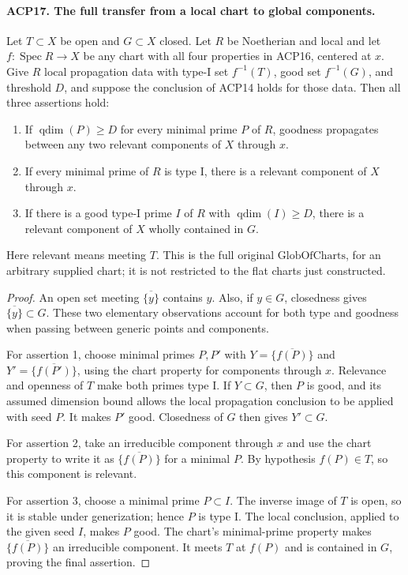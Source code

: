 \documentclass[11pt,a4paper]{article}
\numberwithin{equation}{section}
\theoremstyle{remark}\newtheorem{remark}[theorem]{Remark}
\begin{document}
\paragraph{ACP17. The full transfer from a local chart to global components.}
\label{claim:ACP17}
Let \(T\subset X\) be open and \(G\subset X\) closed.
Let \(R\) be Noetherian and local and let
\(f:\operatorname{Spec}R\to X\) be any chart with all four
properties in ACP16, centered at \(x\).  Give \(R\) local
propagation data with type-I set \(f^{-1}(T)\), good set
\(f^{-1}(G)\), and threshold \(D\), and suppose the conclusion
of ACP14 holds for those data.  Then all three assertions hold:
\begin{enumerate}
\item If \(\operatorname{qdim}(P)\ge D\) for every minimal
      prime \(P\) of \(R\), goodness propagates between any
      two relevant components of \(X\) through \(x\).
\item If every minimal prime of \(R\) is type I, there is
      a relevant component of \(X\) through \(x\).
\item If there is a good type-I prime \(I\) of \(R\) with
      \(\operatorname{qdim}(I)\ge D\), there is a relevant
      component of \(X\) wholly contained in \(G\).
\end{enumerate}
Here relevant means meeting \(T\).  This is the full original
\(\mathrm{GlobOfCharts}\), for an arbitrary supplied chart;
it is not restricted to the flat charts just constructed.

\begin{proof}
An open set meeting \(\overline{\{y\}}\) contains \(y\).
Also, if \(y\in G\), closedness gives
\(\overline{\{y\}}\subset G\).
These two elementary observations account for both type and
goodness when passing between generic points and components.

For assertion 1, choose minimal primes \(P,P'\) with
\(Y=\overline{\{f(P)\}}\) and
\(Y'=\overline{\{f(P')\}}\), using the chart property for
components through \(x\).  Relevance and openness of \(T\)
make both primes type I.  If \(Y\subset G\), then \(P\)
is good, and its assumed dimension bound allows the local
propagation conclusion to be applied with seed \(P\).
It makes \(P'\) good.  Closedness of \(G\) then gives
\(Y'\subset G\).

For assertion 2, take an irreducible component through \(x\)
and use the chart property to write it as
\(\overline{\{f(P)\}}\) for a minimal \(P\).
By hypothesis \(f(P)\in T\), so this component is relevant.

For assertion 3, choose a minimal prime \(P\subset I\).
The inverse image of \(T\) is open, so it is stable under
generization; hence \(P\) is type I.  The local conclusion,
applied to the given seed \(I\), makes \(P\) good.
The chart's minimal-prime property makes
\(\overline{\{f(P)\}}\) an irreducible component.
It meets \(T\) at \(f(P)\) and is contained in \(G\),
proving the final assertion.
\end{proof}
\end{document}
